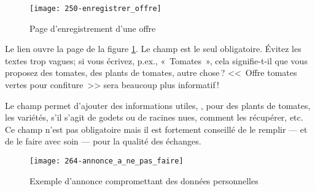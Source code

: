 
\label{sec:texteAnnonce}

\begin{figure}
    \texttt{[image: 250-enregistrer\_offre]}
    \caption{Page d’enregistrement d’une offre}
    \label{fig:enregisterOffre}
\end{figure}
Le lien  ouvre la page de la figure \ref{fig:enregisterOffre}. Le champ  est le seul obligatoire. Évitez les textes trop vagues; si vous écrivez, p.ex., «~Tomates~», cela signifie-t-il que vous proposez des tomates, des plants de tomates, autre chose\,? <<~Offre tomates vertes pour confiture~>> sera beaucoup plus informatif\,!

Le champ  permet d’ajouter des informations utiles, \ex, pour des plants de tomates, les variétés, s'il s'agit de godets ou de racines nues, comment les récupérer, etc. Ce champ n'est pas obligatoire mais il est fortement conseillé de le remplir --- et de le faire avec soin --- pour la qualité des échanges.


\begin{figure}[h]
    \centering
    \texttt{[image: 264-annonce\_a\_ne\_pas\_faire]}
    \caption{Exemple d'annonce compromettant des données personnelles}
    \label{fig:donnees_personnelles_compromises}
\end{figure}

